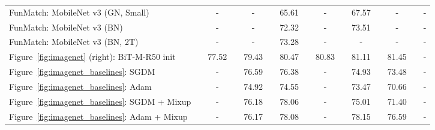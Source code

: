\documentclass[10pt,twocolumn,letterpaper]{article}
\begin{document}
\begin{table*}[t]
\begin{tabularx}{\linewidth}{p{5.4cm}p{0.1cm}Cp{0.01cm}Cp{0.01cm}Cp{0.01cm}Cp{0.01cm}Cp{0.01cm}Cp{0.01cm}C}
FunMatch: MobileNet v3 (GN, Small) &&   -   &&   -   && 65.61 &&   -   && 67.57 &&   -   &&   -   \\
    \midrule[0.25pt]
FunMatch: MobileNet v3 (BN)    &&   -   &&   -   && 72.32 &&   -   && 73.51 &&   -   &&   -   \\
FunMatch: MobileNet v3 (BN, 2T) &&   -   &&   -   && 73.28 &&   -   &&   -   &&   -   &&   -   \\
    \midrule
Figure~\ref{fig:imagenet} (right): BiT-M-R50 init       && 77.52 && 79.43 && 80.47 && 80.83 && 81.11 && 81.45 &&   -   \\
Figure~\ref{fig:imagenet_baselines}: SGDM && - && 76.59 && 76.38 && - && 74.93 && 73.48 && - \\
Figure~\ref{fig:imagenet_baselines}: Adam && - && 74.92 && 74.55 && - && 73.47 && 70.66 && - \\
Figure~\ref{fig:imagenet_baselines}: SGDM + Mixup && - && 76.18 && 78.06 && - && 75.01 && 71.40 && - \\
Figure~\ref{fig:imagenet_baselines}: Adam + Mixup && - && 76.17 && 78.08 && - && 78.15 && 76.59 && - \\
    \bottomrule
  \end{tabularx}
\end{table*}
\end{document}
